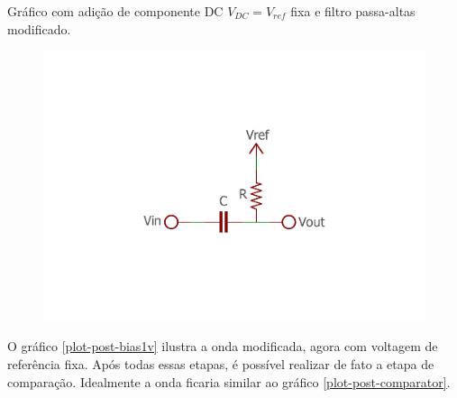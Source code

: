 	\begin{chart}[h]
		\caption{\label{plot-post-bias1v}Gráfico com adição de componente DC $V_{DC} = V_{ref}$ fixa e filtro passa-altas modificado.}
		\begin{subfigure}{.5\textwidth}
			\centering
		\end{subfigure}
		\begin{subfigure}{.5\textwidth}
			\centering
			\includegraphics[width=1\textwidth, trim={3cm 0cm 3cm 3cm},clip]{circuits/highpass_filter_bias.pdf}
		\end{subfigure}
	\end{chart}

	O gráfico \ref{plot-post-bias1v} ilustra a onda modificada, agora com voltagem de referência fixa. Após todas essas etapas, é possível realizar de fato a etapa de comparação. Idealmente a onda ficaria similar ao gráfico \ref{plot-post-comparator}.
	
